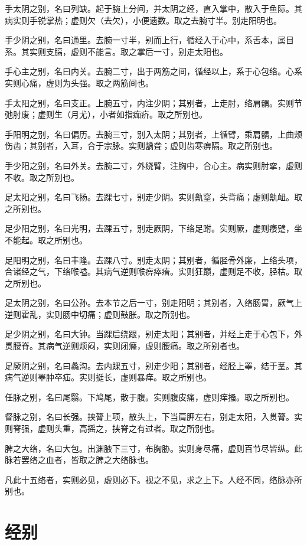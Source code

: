 \documentclass[a4paper,12pt,UTF8,twoside]{ctexbook}
\begin{document}
	手太阴之别，名曰列缺。起于腕上分间，并太阴之经，直入掌中，散入于鱼际。其病实则手锐掌热；虚则欠（去欠），小便遗数。取之去腕寸半。别走阳明也。
	
	手少阴之别，名曰通里。去腕一寸半，别而上行，循经入于心中，系舌本，属目系。其实则支膈，虚则不能言。取之掌后一寸，别走太阳也。
	
	手心主之别，名曰内关。去腕二寸，出于两筋之间，循经以上，系于心包络。心系实则心痛，虚则为头强。取之两筋间也。
	
	手太阳之别，名曰支正。上腕五寸，内注少阴；其别者，上走肘，络肩髃。实则节弛肘废；虚则生（月尤），小者如指痂疥。取之所别也。
	
	手阳明之别，名曰偏历。去腕三寸，别入太阴；其别者，上循臂，乘肩髃，上曲颊伤齿；其别者，入耳，合于宗脉。实则龋聋；虚则齿寒痹隔。取之所别也。
	
	手少阳之别，名曰外关。去腕二寸，外绕臂，注胸中，合心主。病实则肘挛，虚则不收。取之所别也。
	
	足太阳之别，名曰飞扬。去踝七寸，别走少阴。实则鼽窒，头背痛；虚则鼽衄。取之所别也。
	
	足少阳之别，名曰光明，去踝五寸，别走厥阴，下络足跗。实则厥，虚则痿躄，坐不能起。取之所别也。
	
	足阳明之别，名曰丰隆。去踝八寸。别走太阴；其别者，循胫骨外廉，上络头项，合诸经之气，下络喉嗌。其病气逆则喉痹瘁瘖。实则狂巅，虚则足不收，胫枯。取之所别也。
	
	足太阴之别，名曰公孙。去本节之后一寸，别走阳明；其别者，入络肠胃，厥气上逆则霍乱，实则肠中切痛；虚则鼓胀。取之所别也。
	
	足少阴之别，名曰大钟。当踝后绕跟，别走太阳；其别者，并经上走于心包下，外贯腰脊。其病气逆则烦闷，实则闭癃，虚则腰痛。取之所别者也。
	
	足厥阴之别，名曰蠡沟。去内踝五寸，别走少阳；其别者，经胫上睪，结于茎。其病气逆则睪肿卒疝。实则挺长，虚则暴痒。取之所别也。
	
	任脉之别，名曰尾翳。下鸠尾，散于腹。实则腹皮痛，虚则痒搔。取之所别也。
	
	督脉之别，名曰长强。挟膂上项，散头上，下当肩胛左右，别走太阳，入贯膂。实则脊强，虚则头重，高摇之，挟脊之有过者。取之所别也。
	
	脾之大络，名曰大包。出渊腋下三寸，布胸胁。实则身尽痛，虚则百节尽皆纵。此脉若罢络之血者，皆取之脾之大络脉也。
	
	凡此十五络者，实则必见，虚则必下。视之不见，求之上下。人经不同，络脉亦所别也。
	\chapter{经别}
	
\end{document}
